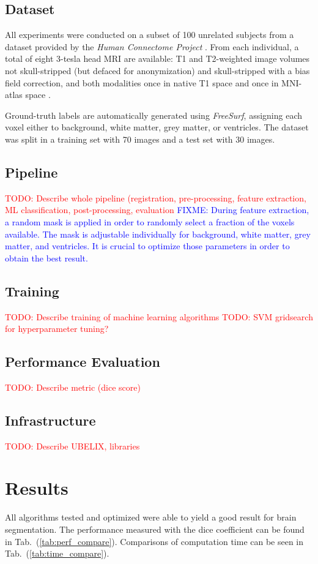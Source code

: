 \documentclass[journal]{IEEEtran}
\newcommand\TODO[1]{\textcolor{red}{TODO: #1}}
\newcommand\FIXME[1]{\textcolor{blue}{FIXME: #1}}
\begin{document}
\subsection{Dataset}
All experiments were conducted on a subset of 100 unrelated subjects from a dataset provided by the \textit{Human Connectome Project} \cite{van2013wu}. From each individual, a total of eight 3-tesla head MRI are available: T1 and T2-weighted image volumes not skull-stripped (but defaced for anonymization) and skull-stripped with a bias field correction, and both modalities once in native T1 space and once in MNI-atlas space \cite{mazziotta2001probabilistic}.

Ground-truth labels are automatically generated using \textit{FreeSurf}, assigning each voxel either to background, white matter, grey matter, or ventricles. The dataset was split in a training set with 70 images and a test set with 30 images.
\subsection{Pipeline}
\TODO{Describe whole pipeline (registration, pre-processing, feature extraction, ML classification, post-processing, evaluation}
\FIXME{During feature extraction, a random mask is applied in order to randomly select a fraction of the voxels available. The mask is adjustable individually for background, white matter, grey matter, and ventricles. It is crucial to optimize those parameters in order to obtain the best result.}

\subsection{Training}
\TODO{Describe training of machine learning algorithms}
\TODO{SVM gridsearch for hyperparameter tuning?}

\subsection{Performance Evaluation}
\TODO{Describe metric (dice score)}

\subsection{Infrastructure}
\TODO{Describe UBELIX, libraries}


\section{Results}
All algorithms tested and optimized were able to yield a good result for brain segmentation. The performance measured with the dice coefficient can be found in Tab.~(\ref{tab:perf_compare}). Comparisons of computation time can be seen in Tab.~(\ref{tab:time_compare}).\\
\end{document}
